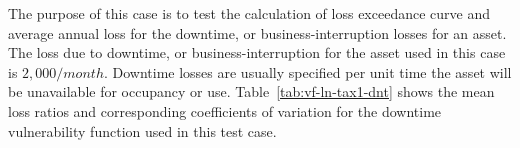 The purpose of this case is to test the calculation of loss exceedance curve and average annual loss for the downtime, or business-interruption losses for an asset. The loss due to downtime, or business-interruption for the asset used in this case is $2,000 / month$. Downtime losses are usually specified per unit time the asset will be unavailable for occupancy or use. Table~\ref{tab:vf-ln-tax1-dnt} shows the mean loss ratios and corresponding coefficients of variation for the downtime vulnerability function used in this test case.